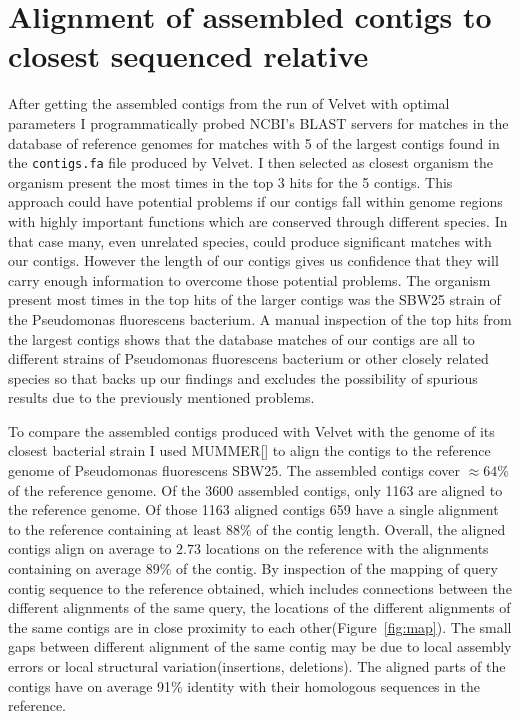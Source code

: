 \documentclass[a4paper,12pt]{article}
\begin{document}
\section{Alignment of assembled contigs to closest sequenced relative}
\label{sec:alignment}
After getting the assembled contigs from the run of Velvet with
optimal parameters I programmatically probed NCBI's BLAST servers for
matches in the database of reference genomes for matches with 5 of the
largest contigs found in the \verb+contigs.fa+ file produced by
Velvet. I then selected as closest organism the organism present the
most times in the top 3 hits for the 5 contigs. This approach could
have potential problems if our contigs fall within genome regions with
highly important functions which are conserved through different
species. In that case many, even unrelated species, could produce
significant matches with our contigs. However the length of our
contigs gives us confidence that they will carry enough information to
overcome those potential problems. The organism present most times in
the top hits of the larger contigs was the SBW25 strain of the
Pseudomonas fluorescens bacterium. A manual inspection of the top hits
from the largest contigs shows that the database matches of our
contigs are all to different strains of Pseudomonas fluorescens
bacterium or other closely related species so that backs up our
findings and excludes the possibility of spurious results due to the
previously mentioned problems.

To compare the assembled contigs produced with Velvet with the genome
of its closest bacterial strain I used
MUMMER[\cite{kurtz2004versatile}] to align the contigs to the
reference genome of Pseudomonas fluorescens SBW25. The assembled
contigs cover $\approx 64\%$ of the reference genome. Of the 3600
assembled contigs, only 1163 are aligned to the reference genome. Of
those 1163 aligned contigs 659 have a single alignment to the
reference containing at least 88\% of the contig length. Overall, the
aligned contigs align on average to $2.73$ locations on the
reference with the alignments containing on average 89\% of the contig. By inspection of the mapping of query contig sequence to
the reference obtained, which includes connections between the
different alignments of the same query, the locations of the different
alignments of the same contigs are in close proximity to each
other(Figure~\ref{fig:map}). The small gaps between different alignment of the same contig may be due to local assembly errors
or local structural variation(insertions, deletions). The aligned
parts of the contigs have on average 91\% identity with their
homologous sequences in the reference.
\end{document}
